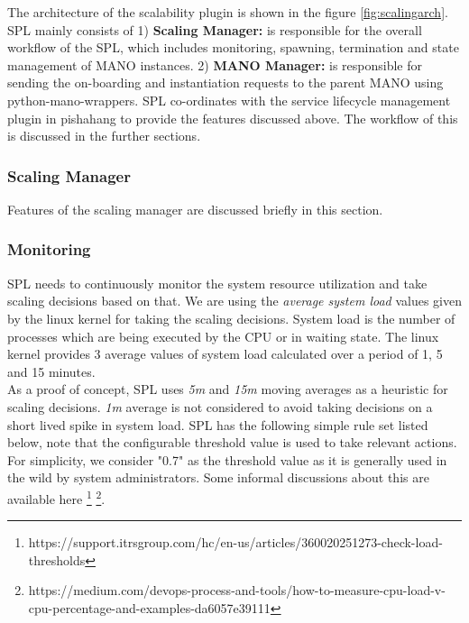 The architecture of the scalability plugin is shown in the figure \ref{fig:scalingarch}. SPL mainly consists of 1) \textbf{Scaling Manager:} is responsible for the overall workflow of the SPL, which includes monitoring, spawning, termination and state management of MANO instances. 2) \textbf{MANO Manager:} is responsible for sending the on-boarding and instantiation requests to the parent MANO using python-mano-wrappers. SPL co-ordinates with the service lifecycle management plugin in pishahang to provide the features discussed above. The workflow of this is discussed in the further sections. 

\subsubsection{Scaling Manager}

Features of the scaling manager are discussed briefly in this section. 

\subsubsection*{Monitoring}

SPL needs to continuously monitor the system resource utilization and take scaling decisions based on that. We are using the \textit{average system load} values given by the linux kernel for taking the scaling decisions. System load is the number of processes which are being executed by the CPU or in waiting state. The linux kernel provides 3 average values of system load calculated over a period of 1, 5 and 15 minutes. \\

As a proof of concept, SPL uses \textit{5m} and \textit{15m} moving averages as a heuristic for scaling decisions. \textit{1m} average is not considered to avoid taking decisions on a short lived spike in system load. SPL has the following simple rule set listed below, note that the configurable threshold value is used to take relevant actions. For simplicity, we consider "0.7" as the threshold value as it is generally used in the wild by system administrators. Some informal discussions about this are available here \footnote{https://support.itrsgroup.com/hc/en-us/articles/360020251273-check-load-thresholds} \footnote{https://medium.com/devops-process-and-tools/how-to-measure-cpu-load-v-cpu-percentage-and-examples-da6057e39111}.

